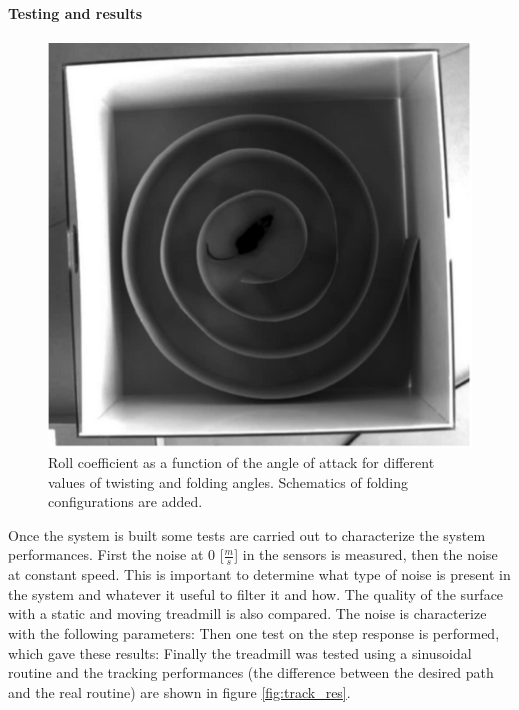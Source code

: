 \documentclass[12pt,a4paper]{article}
\begin{document}
\begin{multicols}{2}
\paragraph{Testing and results}
\begin{figure}[H]
	\centering
	\includegraphics[width=0.9\linewidth]{fig/OleSetup}
	\caption{Roll coefficient as a function of the angle of attack for different values of twisting and folding angles. Schematics of folding configurations are added. }\label{fig:tw_vs_fold_bar}
\end{figure}
Once the system is built some tests are carried out to characterize the system performances.
First the noise at 0 [$\frac{m}{s}$] in the sensors is measured, then the noise at constant speed. This is important to determine what type of noise is present in the system and whatever it useful to filter it and how. The quality of the surface with a static and moving treadmill is also compared. The noise is characterize with the following parameters: 
Then one test on the step response is performed, which gave these results: 
Finally the treadmill was tested using a sinusoidal routine and the tracking performances (the difference between the desired path and the real routine) are shown in figure \ref{fig:track_res}.


\end{multicols}
\end{document}
